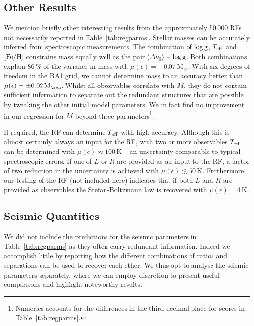 \subsection{Other Results}
We mention briefly other interesting results from the approximately 50\,000 RFs not necessarily reported in Table~\ref{tab:regparms}.
Stellar masses can be accurately inferred from spectroscopic measurements. The combination of  $\log \rm{g}$, $T_{\rm{eff}}$ and $[\rm{Fe/H}]$ constrains mass equally well as the pair $\langle\Delta\nu_0\rangle$ -- $\log \rm{g}$. Both combinations explain 
 86\,\% of the variance in mass with $\mu (\epsilon) = \pm 0.07$\,M$_{\sun}$. With six degrees of freedom in the BA1 grid, we cannot determine mass to an accuracy better than  $\mu (\epsilon) = \pm 0.02\,\rm{M}_{\sun}$.  
 Whilst all observables correlate with $M$, they do not contain sufficient information to separate out the redundant structures that are possible by tweaking the other initial model parameters. We in fact find no improvement in our regression for $M$ beyond three parameters\footnote{Numerics accounts for the differences in the third decimal place for scores in Table~\ref{tab:regparms}.}. 

If required, the RF can determine $T_{\rm{eff}}$ with high accuracy. 
Although this is almost certainly always an input for the RF, with two or more observables $T_{\rm{eff}}$ can be determined with  $\mu (\epsilon) \approx 100$\,K -- an uncertainty comparable to typical spectroscopic errors. If one of $L$ or $R$ are provided as an input to the RF, a factor of two reduction in the uncertainty is achieved with $\mu (\epsilon) \lesssim 50$\,K. Furthermore, our testing of the RF (not included here) indicates that if both $L$ and $R$ are provided as observables the Stefan-Boltzmann law is recovered with $\mu (\epsilon) = 4$\,K. 
 


\subsection{Seismic Quantities} \label{sec:seispr}
We did not include the predictions for the seismic parameters in Table~\ref{tab:regparms} as they often carry redundant information. Indeed we accomplish little 
by reporting how the different combinations of ratios and separations can be used to recover each other. 
We thus opt to analyse the seismic parameters separately, where we can employ discretion to present useful comparisons and highlight noteworthy results. 

